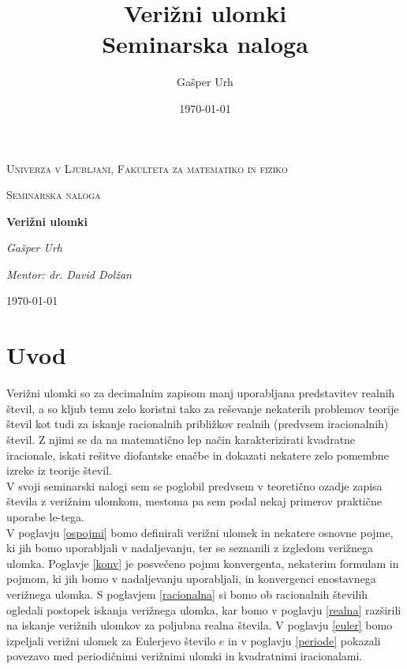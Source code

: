 \documentclass[a4paper,12pt]{article}
\title{\textbf{\huge{Verižni ulomki}\\\normalsize{Seminarska naloga}}}
\author{Gašper Urh}
\date{\today}
\theoremstyle{definition}
\theoremstyle{proposition}
\theoremstyle{theorem}
\theoremstyle{lemma}
\begin{document}
\begin{titlepage}
	\centering
	{\scshape\LARGE Univerza v Ljubljani, Fakulteta za matematiko in fiziko\par}
	\vspace{1cm}
	{\scshape\Large Seminarska naloga\par}
	\vspace{1.5cm}
	{\huge\bfseries Verižni ulomki\par}
	\vspace{2cm}
	{\Large\itshape Gašper Urh\par}

	\vfill

	{\textit{Mentor: dr. David Dolžan}}\par
	\vspace{1cm}
	{\large \today\par}
\end{titlepage}

\tableofcontents
\newpage

\section{Uvod}

Verižni ulomki so za decimalnim zapisom manj uporabljana predstavitev realnih števil, a so kljub temu zelo koristni tako za reševanje nekaterih problemov teorije števil kot tudi za iskanje racionalnih približkov realnih (predvsem iracionalnih) števil. Z njimi se da na matematično lep način karakterizirati kvadratne iracionale, iskati rešitve diofantske enačbe in dokazati nekatere zelo pomembne izreke iz teorije števil. \\
V svoji seminarski nalogi sem se poglobil predvsem v teoretično ozadje zapisa števila z verižnim ulomkom, mestoma pa sem podal nekaj primerov praktične uporabe le-tega.\\
V poglavju \ref{ospojmi} bomo definirali verižni ulomek in nekatere osnovne pojme, ki jih bomo uporabljali v nadaljevanju, ter se seznanili z izgledom verižnega ulomka. Poglavje \ref{konv} je posvečeno pojmu konvergenta, nekaterim formulam in pojmom, ki jih bomo v nadaljevanju uporabljali, in konvergenci enostavnega verižnega ulomka. S poglavjem \ref{racionalna} si bomo ob racionalnih številih ogledali postopek iskanja verižnega ulomka, kar bomo v poglavju \ref{realna} razširili na iskanje verižnih ulomkov za poljubna realna števila. V poglavju \ref{euler} bomo izpeljali verižni ulomek za Eulerjevo število $e$ in v poglavju \ref{periode} pokazali povezavo med periodičnimi verižnimi ulomki in kvadratnimi iracionalami.
\end{document}
